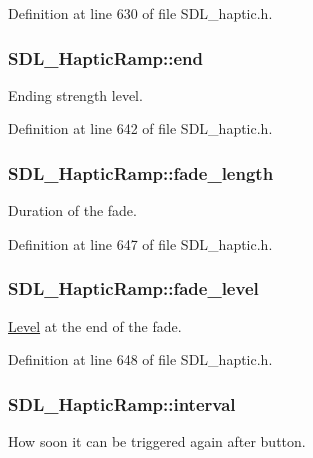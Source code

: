 Definition at line 630 of file S\-D\-L\-\_\-haptic.\-h.

\hypertarget{struct_s_d_l___haptic_ramp_a16dd3ee307795248e21ee45ba8fb4c6c}{
\subsubsection[{end}]{ S\-D\-L\-\_\-\-Haptic\-Ramp\-::end}}\label{struct_s_d_l___haptic_ramp_a16dd3ee307795248e21ee45ba8fb4c6c}
Ending strength level. 

Definition at line 642 of file S\-D\-L\-\_\-haptic.\-h.

\hypertarget{struct_s_d_l___haptic_ramp_ad58a8f7cfdf659b45f0503fc56db7436}{
\subsubsection[{fade\-\_\-length}]{ S\-D\-L\-\_\-\-Haptic\-Ramp\-::fade\-\_\-length}}\label{struct_s_d_l___haptic_ramp_ad58a8f7cfdf659b45f0503fc56db7436}
Duration of the fade. 

Definition at line 647 of file S\-D\-L\-\_\-haptic.\-h.

\hypertarget{struct_s_d_l___haptic_ramp_a66b586f2e6a23a085a7b2854f61752c5}{
\subsubsection[{fade\-\_\-level}]{ S\-D\-L\-\_\-\-Haptic\-Ramp\-::fade\-\_\-level}}\label{struct_s_d_l___haptic_ramp_a66b586f2e6a23a085a7b2854f61752c5}
\hyperlink{class_level}{Level} at the end of the fade. 

Definition at line 648 of file S\-D\-L\-\_\-haptic.\-h.

\hypertarget{struct_s_d_l___haptic_ramp_a4b89d108cfa7e96ea58b58771334c33d}{
\subsubsection[{interval}]{ S\-D\-L\-\_\-\-Haptic\-Ramp\-::interval}}\label{struct_s_d_l___haptic_ramp_a4b89d108cfa7e96ea58b58771334c33d}
How soon it can be triggered again after button. 

